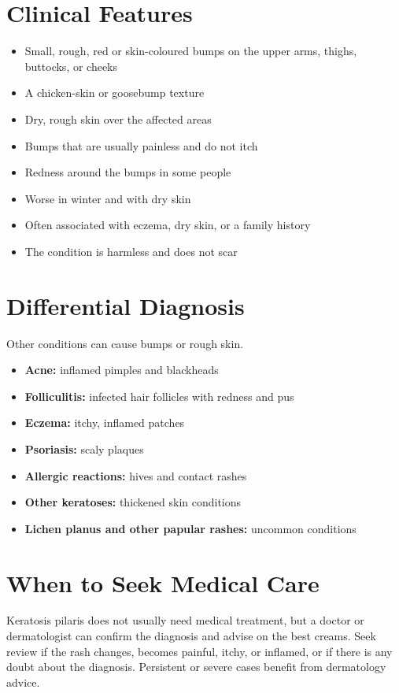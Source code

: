 \section*{Clinical Features}
\begin{itemize}
    \item Small, rough, red or skin-coloured bumps on the upper arms, thighs, buttocks, or cheeks
    \item A chicken-skin or goosebump texture
    \item Dry, rough skin over the affected areas
    \item Bumps that are usually painless and do not itch
    \item Redness around the bumps in some people
    \item Worse in winter and with dry skin
    \item Often associated with eczema, dry skin, or a family history
    \item The condition is harmless and does not scar
\end{itemize}

\section*{Differential Diagnosis}
Other conditions can cause bumps or rough skin.
\begin{itemize}
    \item \textbf{Acne:} inflamed pimples and blackheads
    \item \textbf{Folliculitis:} infected hair follicles with redness and pus
    \item \textbf{Eczema:} itchy, inflamed patches
    \item \textbf{Psoriasis:} scaly plaques
    \item \textbf{Allergic reactions:} hives and contact rashes
    \item \textbf{Other keratoses:} thickened skin conditions
    \item \textbf{Lichen planus and other papular rashes:} uncommon conditions
\end{itemize}

\section*{When to Seek Medical Care}
Keratosis pilaris does not usually need medical treatment, but a doctor or dermatologist can confirm the diagnosis and advise on the best creams. Seek review if the rash changes, becomes painful, itchy, or inflamed, or if there is any doubt about the diagnosis. Persistent or severe cases benefit from dermatology advice.

